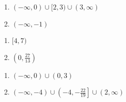 \begin{multicols}{2}
\begin{enumerate}
\setcounter{enumi}{\value{HW}}

\item $(-\infty, 0) \cup [2,3) \cup (3, \infty)$
\item $(-\infty, -1)$  


\setcounter{HW}{\value{enumi}}
\end{enumerate}
\end{multicols}

\begin{multicols}{2}
\begin{enumerate}
\setcounter{enumi}{\value{HW}}

\item $[4,7)$  
\item $\left(0, \frac{27}{13} \right)$

\setcounter{HW}{\value{enumi}}
\end{enumerate}
\end{multicols}

\begin{multicols}{2}
\begin{enumerate}
\setcounter{enumi}{\value{HW}}
\item $(-\infty, 0) \cup (0,3)$   \vphantom{$(-\infty, -4) \cup \left(-4, -\frac{22}{19}\right] \cup (2, \infty)$}
\item $(-\infty, -4) \cup \left(-4, -\frac{22}{19}\right] \cup (2, \infty)$

\setcounter{HW}{\value{enumi}}
\end{enumerate}
\end{multicols}

